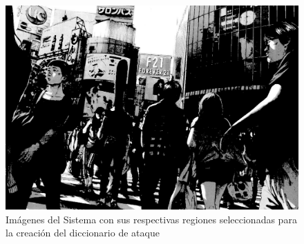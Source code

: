 \begin{figure}[H]
\begin{minipage}[b]{0.3\textwidth}
		\includegraphics[width=\textwidth]{Graphics/japan-selected-regions.jpg}
	\end{minipage}
	\caption{Imágenes del Sistema con sus respectivas regiones seleccionadas para la creaci\'on del diccionario de ataque}
	\label{fig:selected-points}
\end{figure}


